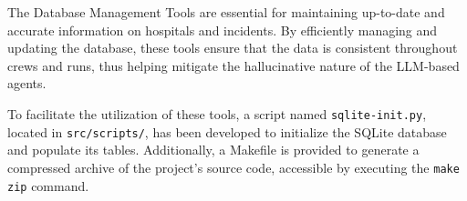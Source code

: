 The Database Management Tools are essential for maintaining up-to-date and accurate information on hospitals and incidents. By efficiently managing and updating the database, these tools ensure that the data is consistent throughout crews and runs, thus helping mitigate the hallucinative nature of the LLM-based agents.

To facilitate the utilization of these tools, a script named \texttt{sqlite-init.py}, located in \texttt{src/scripts/}, has been developed to initialize the SQLite database and populate its tables. Additionally, a Makefile is provided to generate a compressed archive of the project's source code, accessible by executing the \texttt{make zip} command.
